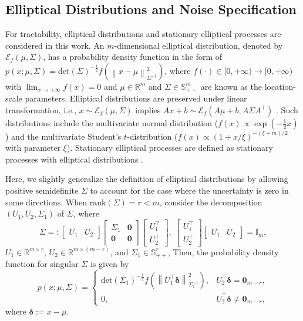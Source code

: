 \documentclass{ifacconf}
\newcommand{\norm}[1]{\left\lVert#1\right\rVert}
\newcommand{\rank}[1]{\mathrm{rank}\left(#1\right)}
\newcommand{\dett}[1]{\mathrm{det}\left(#1\right)}
\newcommand{\ellip}[1]{\mathcal{E}_f\left(#1\right)}
\begin{document}
\subsection{Elliptical Distributions and Noise Specification}

For tractability, elliptical distributions and stationary elliptical processes are considered in this work. An $m$-dimensional elliptical distribution, denoted by $\ellip{\mu,\Sigma}$, has a probability density function in the form of $p(x;\mu,\Sigma)=\dett\Sigma^{-\frac{1}{2}}f\left(\norm{x-\mu}_{\Sigma^{-1}}^2\right)$, where 
$f(\cdot)\in[0,+\infty)\to[0,+\infty)$ with $\lim_{x\to +\infty}f(x)=0$ and 
$\mu\in\mathbb{R}^m$ and $\Sigma\in\mathbb{S}_{++}^m$ are known as the location-scale parameters. Elliptical distributions are preserved under linear transformation, i.e., $x\sim\ellip{\mu,\Sigma}$ implies $Ax+b\sim\ellip{A\mu+b,A\Sigma A^\top}$ \citep{Hult_Lindskog_2002}. Such distributions include the multivariate normal distribution ($f(x)\propto\exp\left(-\frac{1}{2}x\right)$) and the multivariate Student's $t$-distribution ($f(x)\propto\left(1+x/\xi\right)^{-(\xi+m)/2}$ with parameter $\xi$). Stationary elliptical processes are defined as stationary processes with elliptical distributions \citep{bankestad2023variational}. 

Here, we slightly generalize the definition of elliptical distributions by allowing positive semidefinite $\Sigma$ to account for the case where the uncertainty is zero in some directions. When $\rank{\Sigma}=r<m$, consider the decomposition $\left(U_1,U_2,\Sigma_1\right)$ of $\Sigma$, where
\begin{equation}
    \Sigma=:\begin{bmatrix}
    U_1&U_2
\end{bmatrix}\begin{bmatrix}
    \Sigma_1&\mathbf{0}\\
    \mathbf{0}&\mathbf{0}
\end{bmatrix}\begin{bmatrix}
    U_1^\top\\U_2^\top
\end{bmatrix},\ 
\begin{bmatrix}
    U_1^\top\\U_2^\top
\end{bmatrix}\begin{bmatrix}
    U_1&U_2
\end{bmatrix}=\mathbb{I}_m,
\label{eq:semidef}
\end{equation}
$U_1\in\mathbb{R}^{m\times r}$, $U_2\in\mathbb{R}^{m\times (m-r)}$, and $\Sigma_1\in\mathbb{S}_{++}^r$, Then, the probability density function for singular $\Sigma$ is given by
\begin{equation*}
    p(x;\mu,\Sigma)=\begin{cases}
        \dett{\Sigma_1}^{-\frac{1}{2}}f\left(\norm{U_1^\top\boldsymbol{\delta}}_{\Sigma_1^{-1}}^2\right),&U_2^\top\boldsymbol{\delta}=\mathbf{0}_{m-r},\\
        0,&U_2^\top\boldsymbol{\delta}\neq\mathbf{0}_{m-r},
    \end{cases}
\end{equation*}
where $\boldsymbol{\delta}:=x-\mu$.
\end{document}
